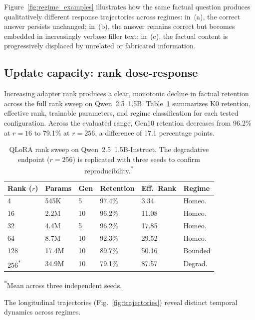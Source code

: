 \documentclass[a4paper,fleqn]{cas-dc}
\begin{document}
Figure~\ref{fig:regime_examples} illustrates how the same factual question
produces qualitatively different response trajectories across regimes: in~(a),
the correct answer persists unchanged; in~(b), the answer remains correct but
becomes embedded in increasingly verbose filler text; in~(c), the factual
content is progressively displaced by unrelated or fabricated information.

\subsection{Update capacity: rank dose-response}\label{sec:res_capacity}

Increasing adapter rank produces a clear, monotonic decline in factual retention
across the full rank sweep on Qwen~2.5~1.5B.
Table~\ref{tab:rank_sweep} summarizes K0 retention, effective rank, trainable
parameters, and regime classification for each tested configuration. Across the
evaluated range, Gen10 retention decreases from 96.2\% at $r=16$ to 79.1\% at
$r=256$, a difference of 17.1 percentage points.

\begin{table}[width=.95\linewidth,cols=6,pos=htbp]
\caption{QLoRA rank sweep on Qwen~2.5~1.5B-Instruct. The degradative endpoint
($r=256$) is replicated with three seeds to confirm
reproducibility.\textsuperscript{*}}\label{tab:rank_sweep}
\begin{tabular*}{\tblwidth}{@{}l@{\hskip 4pt}l@{\hskip 4pt}l@{\hskip 4pt}l@{\hskip 4pt}l@{\hskip 4pt}l@{}}
\toprule
Rank ($r$) & Params & Gen & Retention & Eff.\ Rank & Regime \\
\midrule
4   & 545K  & 5  & 97.4\%  & 3.34  & Homeo. \\
16  & 2.2M  & 10 & 96.2\%  & 11.08 & Homeo. \\
32  & 4.4M  & 5  & 96.2\%  & 17.85 & Homeo. \\
64  & 8.7M  & 10 & 92.3\%  & 29.52 & Homeo. \\
128 & 17.4M & 10 & 89.7\%  & 50.16 & Bounded \\
256\textsuperscript{*} & 34.9M & 10 & 79.1\%  & 87.57 & Degrad. \\
\bottomrule
\end{tabular*}
{\footnotesize \textsuperscript{*}Mean across three independent seeds.}
\end{table}

The longitudinal trajectories (Fig.~\ref{fig:trajectories}) reveal distinct
temporal dynamics across regimes.
\end{document}

